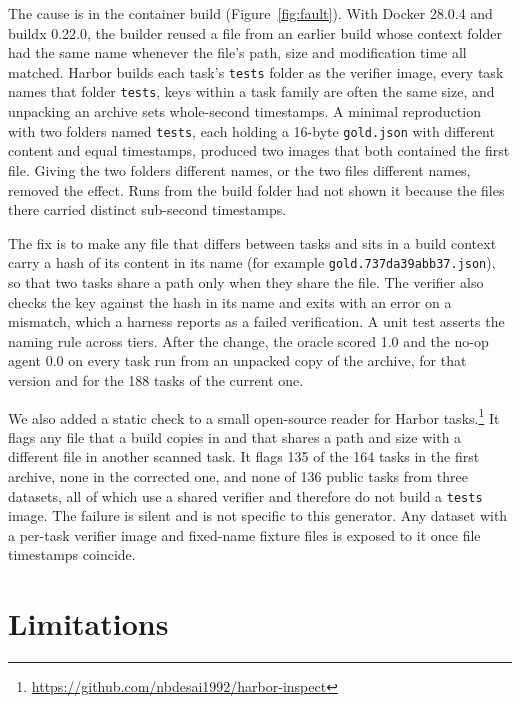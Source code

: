 \documentclass{article}
\newcommand{\code}[1]{\texttt{\small #1}}
\begin{document}
The cause is in the container build (Figure~\ref{fig:fault}). With Docker 28.0.4 and buildx 0.22.0, the builder reused a file from an earlier build whose context folder had the same name whenever the file's path, size and modification time all matched. Harbor builds each task's \code{tests} folder as the verifier image, every task names that folder \code{tests}, keys within a task family are often the same size, and unpacking an archive sets whole-second timestamps. A minimal reproduction with two folders named \code{tests}, each holding a 16-byte \code{gold.json} with different content and equal timestamps, produced two images that both contained the first file. Giving the two folders different names, or the two files different names, removed the effect. Runs from the build folder had not shown it because the files there carried distinct sub-second timestamps.

The fix is to make any file that differs between tasks and sits in a build context carry a hash of its content in its name (for example \code{gold.737da39abb37.json}), so that two tasks share a path only when they share the file. The verifier also checks the key against the hash in its name and exits with an error on a mismatch, which a harness reports as a failed verification. A unit test asserts the naming rule across tiers. After the change, the oracle scored 1.0 and the no-op agent 0.0 on every task run from an unpacked copy of the archive, for that version and for the 188 tasks of the current one.

We also added a static check to a small open-source reader for Harbor tasks.\footnote{\url{https://github.com/nbdesai1992/harbor-inspect}} It flags any file that a build copies in and that shares a path and size with a different file in another scanned task. It flags 135 of the 164 tasks in the first archive, none in the corrected one, and none of 136 public tasks from three datasets, all of which use a shared verifier and therefore do not build a \code{tests} image. The failure is silent and is not specific to this generator. Any dataset with a per-task verifier image and fixed-name fixture files is exposed to it once file timestamps coincide.

\section{Limitations}
\end{document}

